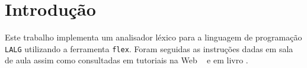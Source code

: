 \section{Introdução \label{sec:introducao}}

Este trabalho implementa um analisador léxico para a linguagem de programação \texttt{LALG} utilizando a ferramenta \texttt{flex}. Foram seguidas as instruções dadas em sala de aula assim como consultadas em tutoriais na Web \cite{bib:flex}~\cite{bib:youtube} e em livro \cite{bib:livro}.
